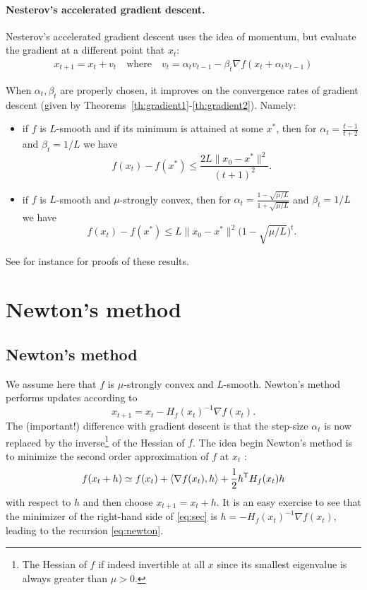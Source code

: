 \documentclass[11pt,nocut]{article}
\begin{document}
\paragraph{Nesterov's accelerated gradient descent.}

Nesterov's accelerated gradient descent uses the idea of momentum, but evaluate the gradient at a different point that $x_t$:
\begin{align*}
	x_{t+1} = x_t + v_t
	\quad \text{where} \quad
	v_t = \alpha_t v_{t-1} - \beta_t \nabla f(x_{t} + \alpha_t v_{t-1})
\end{align*}

When $\alpha_t,\beta_t$ are properly chosen, it improves on the convergence rates of gradient descent (given by Theorems~\ref{th:gradient1}-\ref{th:gradient2}). Namely:
\begin{itemize}
	\item if $f$ is $L$-smooth and if its minimum is attained at some $x^*$, then for $\alpha_t = \frac{t-1}{t+2}$ and $\beta_t = 1/L$ we have
		$$
		f(x_t) - f(x^*) \leq \frac{2L \|x_0-x^*\|^2}{(t+1)^2}.
		$$
	\item if $f$ is $L$-smooth and $\mu$-strongly convex, then for $\alpha_t = \frac{1-\sqrt{\mu/L}}{1+\sqrt{\mu/L}}$ and $\beta_t = 1/L$ we have
		$$
		f(x_t) - f(x^*) \leq L \|x_0-x^*\|^2 \Big(1-\sqrt{\mu/L}\Big)^t.
		$$
\end{itemize}
See for instance \cite{schmidt2011convergence} for proofs of these results.


\section{Newton's method}

\subsection{Newton's method}
We assume here that $f$ is $\mu$-strongly convex and $L$-smooth.
Newton's method performs updates according to
\begin{equation}\label{eq:newton}
	x_{t+1} = x_t - H_f(x_t)^{-1} \nabla f(x_t).
\end{equation}
The (important!) difference with gradient descent is that the step-size $\alpha_t$ is now replaced by the inverse\footnote{The Hessian of $f$ if indeed invertible at all $x$ since its smallest eigenvalue is always greater than $\mu >0$.} of the Hessian of $f$. The idea begin Newton's method is to minimize the second order approximation of $f$ at $x_t$ :
\begin{equation}\label{eq:sec}
	f(x_t+h) \simeq f(x_t) + \langle \nabla f(x_t), h \rangle + \frac{1}{2} h^{{\sf T}} H_f(x_t) h
\end{equation}
with respect to $h$ and then choose $x_{t+1} = x_t + h$. It is an easy exercise to see that the minimizer of the right-hand side of \eqref{eq:sec} is $h=- H_f(x_t)^{-1} \nabla f(x_t)$, leading to the recursion \eqref{eq:newton}.
\\
\end{document}
